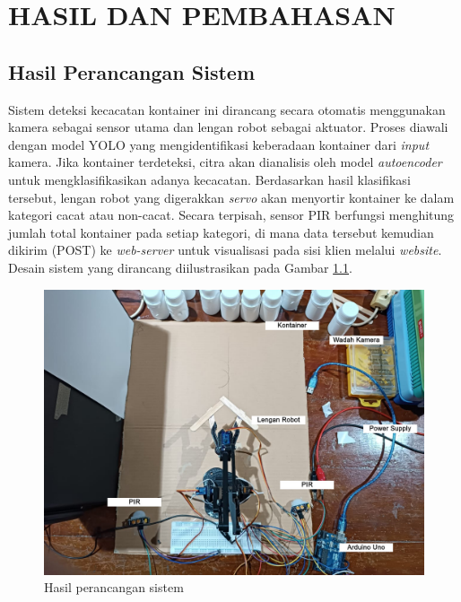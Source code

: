 \chapter{HASIL DAN PEMBAHASAN}
\section{Hasil Perancangan Sistem}
Sistem deteksi kecacatan kontainer ini dirancang secara otomatis
menggunakan kamera sebagai sensor utama dan lengan robot sebagai
aktuator. Proses diawali dengan model YOLO yang mengidentifikasi
keberadaan kontainer dari \textit{input} kamera. Jika kontainer terdeteksi,
citra akan dianalisis oleh model \textit{autoencoder} untuk mengklasifikasikan
adanya kecacatan. Berdasarkan hasil klasifikasi tersebut, lengan
robot yang digerakkan \textit{servo} akan menyortir kontainer ke dalam
kategori cacat atau non-cacat. Secara terpisah, sensor PIR berfungsi
menghitung jumlah total
kontainer pada setiap kategori, di mana data tersebut kemudian
dikirim (POST) ke \textit{web-server} untuk visualisasi pada sisi
klien melalui \textit{website}. Desain
sistem yang dirancang diilustrasikan pada Gambar \ref{fig:rancang-sistem}.

\begin{figure}[H]
  \centering
  \includegraphics[width=\textwidth]{gambar/rancang_sistem.jpg}
  \caption{Hasil perancangan sistem}
  \label{fig:rancang-sistem}
\end{figure}
\vspace{-1em}

\vspace{1em}

